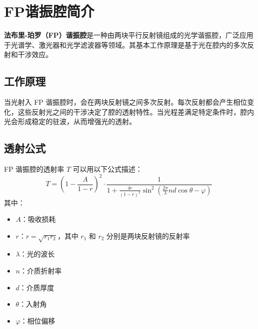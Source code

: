 \documentclass[12pt,hyperref,a4paper,UTF8]{ctexart}
\begin{document}
\cover



\thispagestyle{empty} %

\newpage
\tableofcontents

\newpage


\section{FP谐振腔简介}

\textbf{法布里-珀罗（FP）谐振腔}是一种由两块平行反射镜组成的光学谐振腔，广泛应用于光谱学、激光器和光学滤波器等领域。其基本工作原理是基于光在腔内的多次反射和干涉效应。

\subsection*{工作原理}
当光射入 FP 谐振腔时，会在两块反射镜之间多次反射。每次反射都会产生相位变化，这些反射光之间的干涉决定了腔的透射特性。当光程差满足特定条件时，腔内光会形成稳定的驻波，从而增强光的透射。

\subsection*{透射公式}
FP 谐振腔的透射率 \( T \) 可以用以下公式描述：
\begin{equation}
T = \left(1 - \frac{A}{1 - r}\right)^2 \cdot \frac{1}{1 + \frac{4r}{(1 - r)^2} \sin^2\left(\frac{2\pi}{\lambda} n d \cos\theta - \varphi\right)}
\label{eq:transmission}
\end{equation}
其中：
\begin{itemize}
    \item \( A \)：吸收损耗
    \item \( r \)：$r=\sqrt{r_1r_2}$，其中 \( r_1 \) 和 \( r_2 \) 分别是两块反射镜的反射率
    \item \( \lambda \)：光的波长
    \item \( n \)：介质折射率
    \item \( d \)：介质厚度
    \item \( \theta \)：入射角
    \item \( \varphi \)：相位偏移
\end{itemize}
\end{document}
